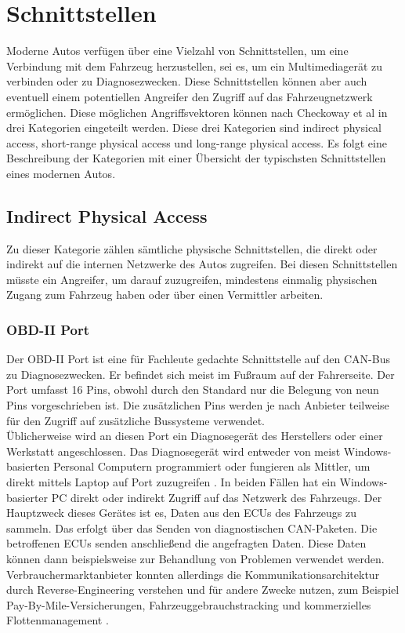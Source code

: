 \section{Schnittstellen}
Moderne Autos verfügen über eine Vielzahl von Schnittstellen, um eine Verbindung mit dem Fahrzeug herzustellen, sei es, um ein Multimediagerät zu verbinden oder zu Diagnosezwecken. Diese Schnittstellen können aber auch eventuell einem potentiellen Angreifer den Zugriff auf das Fahrzeugnetzwerk ermöglichen. Diese möglichen Angriffsvektoren können nach Checkoway et al \cite[1]{Checkoway.2011} in drei Kategorien eingeteilt werden. Diese drei Kategorien sind \glqq indirect physical access\grqq , \glqq short-range physical access\grqq{} und \glqq long-range physical access\grqq . Es folgt eine Beschreibung der Kategorien mit einer Übersicht der typischsten Schnittstellen eines modernen Autos.

\subsection{Indirect Physical Access}
Zu dieser Kategorie zählen sämtliche physische Schnittstellen, die direkt oder indirekt auf die internen Netzwerke des Autos zugreifen. Bei diesen Schnittstellen müsste ein Angreifer, um darauf zuzugreifen, mindestens einmalig physischen Zugang zum Fahrzeug haben oder über einen Vermittler arbeiten. 


\subsubsection{OBD-II Port} \label{OBD-II}
Der \ac{OBD}-II Port ist eine für Fachleute gedachte Schnittstelle auf den \acs{CAN}-Bus zu Diagnosezwecken.	Er befindet sich meist im Fußraum auf der Fahrerseite. Der Port umfasst 16 Pins, obwohl durch den Standard nur die Belegung von neun Pins vorgeschrieben ist. Die zusätzlichen Pins werden je nach Anbieter teilweise für den Zugriff auf zusätzliche Bussysteme verwendet. \cite[2]{Klinedinst.2016} \\
Üblicherweise wird an diesen Port ein Diagnosegerät des Herstellers oder einer Werkstatt angeschlossen. Das Diagnosegerät wird entweder von meist Windows-basierten Personal Computern programmiert oder fungieren als Mittler, um direkt mittels Laptop auf Port zuzugreifen \cite[3]{Checkoway.2011}. In beiden Fällen hat ein Windows-basierter PC direkt oder indirekt Zugriff auf das Netzwerk des Fahrzeugs. Der Hauptzweck dieses Gerätes ist es, Daten aus den \acsp{ECU} des Fahrzeugs zu sammeln. Das erfolgt über das Senden von diagnostischen \acs{CAN}-Paketen. Die betroffenen \acsp{ECU} senden anschließend die angefragten Daten. Diese Daten können dann beispielsweise zur Behandlung von Problemen verwendet werden.\\
Verbrauchermarktanbieter konnten allerdings die Kommunikationsarchitektur durch Reverse-Engineering verstehen und für andere Zwecke nutzen, zum Beispiel Pay-By-Mile-Versicherungen, Fahrzeuggebrauchstracking und kommerzielles Flottenmanagement \cite[3]{Klinedinst.2016}. \\

